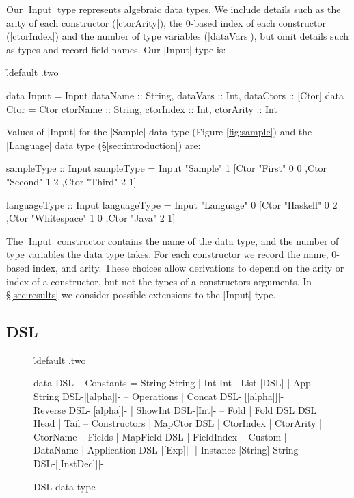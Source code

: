 \documentclass[preprint,draft]{sigplanconf}
\begin{document}
Our |Input| type represents algebraic data types. We include details such as the arity of each constructor (|ctorArity|), the 0-based index of each constructor (|ctorIndex|) and the number of type variables (|dataVars|), but omit details such as types and record field names. Our |Input| type is:

\h{.default .two}\begin{code}
data Input = Input
    {dataName :: String, dataVars :: Int, dataCtors :: [Ctor]}
data Ctor = Ctor
    {ctorName :: String, ctorIndex :: Int, ctorArity :: Int}
\end{code}

\noindent Values of |Input| for the |Sample| data type (Figure \ref{fig:sample}) and the |Language| data type (\S\ref{sec:introduction}) are:

\begin{code}
sampleType :: Input
sampleType = Input "Sample" 1
    [Ctor "First"   0 0
    ,Ctor "Second"  1 2
    ,Ctor "Third"   2 1]

languageType :: Input
languageType = Input "Language" 0
    [Ctor "Haskell"     0 2
    ,Ctor "Whitespace"  1 0
    ,Ctor "Java"        2 1]
\end{code}

The |Input| constructor contains the name of the data type, and the number of type variables the data type takes. For each constructor we record the name, 0-based index, and arity. These choices allow derivations to depend on the arity or index of a constructor, but not the types of a constructors arguments. In \S\ref{sec:results} we consider possible extensions to the |Input| type.

\subsection{DSL}

\begin{figure}
\h{.default .two}\begin{code}
data DSL
       -- Constants
    =  String String
    |  Int Int
    |  List [DSL]
    |  App String DSL{-|[alpha]|-}
       -- Operations
    |  Concat DSL{-|[[alpha]]|-}
    |  Reverse DSL{-|[alpha]|-}
    |  ShowInt DSL{-|Int|-}
       -- Fold
    |  Fold DSL DSL
    |  Head
    |  Tail
       -- Constructors
    |  MapCtor DSL
    |  CtorIndex
    |  CtorArity
    |  CtorName
       -- Fields
    |  MapField DSL
    |  FieldIndex
       -- Custom
    |  DataName
    |  Application DSL{-|[Exp]|-}
    |  Instance [String] String DSL{-|[InstDecl]|-}
\end{code}
\caption{DSL data type}
\label{fig:dsl}
\end{figure}
\end{document}
